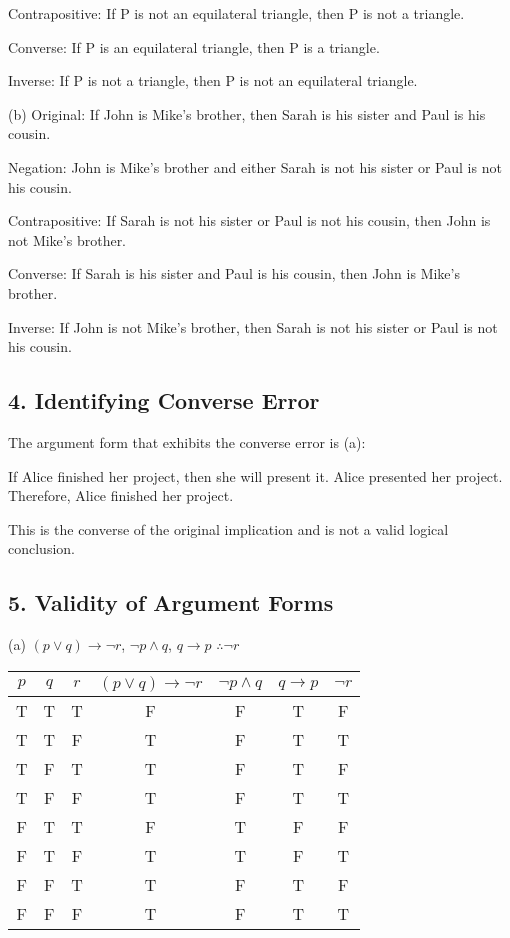 \documentclass{article}
\begin{document}
   Contrapositive: If P is not an equilateral triangle, then P is not a triangle.
   
   Converse: If P is an equilateral triangle, then P is a triangle.
   
   Inverse: If P is not a triangle, then P is not an equilateral triangle.

(b) Original: If John is Mike's brother, then Sarah is his sister and Paul is his cousin.
   
   Negation: John is Mike's brother and either Sarah is not his sister or Paul is not his cousin.
   
   Contrapositive: If Sarah is not his sister or Paul is not his cousin, then John is not Mike's brother.
   
   Converse: If Sarah is his sister and Paul is his cousin, then John is Mike's brother.
   
   Inverse: If John is not Mike's brother, then Sarah is not his sister or Paul is not his cousin.

\subsection*{4. Identifying Converse Error}

The argument form that exhibits the converse error is (a):

If Alice finished her project, then she will present it.
Alice presented her project.
Therefore, Alice finished her project.

This is the converse of the original implication and is not a valid logical conclusion.

\subsection*{5. Validity of Argument Forms}

(a) $(p \vee q) \rightarrow \neg r$, $\neg p \wedge q$, $q \rightarrow p$ $\therefore \neg r$

\begin{center}
\begin{tabular}{|c|c|c|c|c|c|c|}
\hline
$p$ & $q$ & $r$ & $(p \vee q) \rightarrow \neg r$ & $\neg p \wedge q$ & $q \rightarrow p$ & $\neg r$ \\
\hline
T & T & T & F & F & T & F \\
T & T & F & T & F & T & T \\
T & F & T & T & F & T & F \\
T & F & F & T & F & T & T \\
F & T & T & F & T & F & F \\
F & T & F & T & T & F & T \\
F & F & T & T & F & T & F \\
F & F & F & T & F & T & T \\
\hline
\end{tabular}
\end{center}
\end{document}
